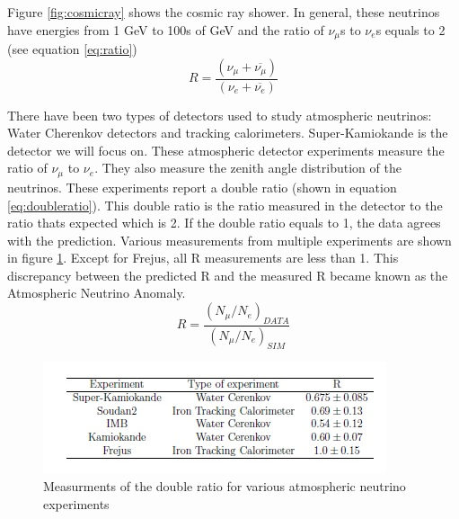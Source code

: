Figure \ref{fig:cosmicray} shows the cosmic ray shower. In general, these neutrinos have energies from 1 GeV to 100s of GeV and the ratio of $\nu_{\mu}$s to $\nu_{e}$s equals to 2 (see equation \ref{eq:ratio})
\begin{equation}
\label{eq:ratio}
R = \frac{(\nu_{\mu} + \overline{\nu_{\mu}})}{(\nu_{e} + \overline{\nu_{e}})}
\end{equation} 



There have been two types of detectors used to study atmospheric neutrinos: Water Cherenkov detectors and tracking calorimeters. Super-Kamiokande is the detector we will focus on. These atmospheric detector experiments measure the ratio of $\nu_{\mu}$ to $\nu_{e}$. They also measure the zenith angle distribution of the neutrinos. These experiments report a double ratio (shown in equation \ref{eq:doubleratio}). This double ratio is the ratio measured in the detector to the ratio thats expected which is 2. If the double ratio equals to 1, the data agrees with the prediction. Various measurements from multiple experiments are shown in figure \ref{fig:ratiotable}. Except for Frejus, all R measurements are less than 1. This discrepancy between the predicted R and the measured R became known as the Atmospheric Neutrino Anomaly.
\begin{equation}
\label{eq:doubleratio}
R = \frac{(N_{\mu}/N_{e})_{DATA}}{(N_{\mu}/N_{e})_{SIM}}
\end{equation}

\begin{figure}[htp]
\centering
\includegraphics[scale=1]{figs/ratio.jpg}
\caption{Measurments of the double ratio for various atmospheric neutrino experiments}
\label{fig:ratiotable}
\end{figure}

